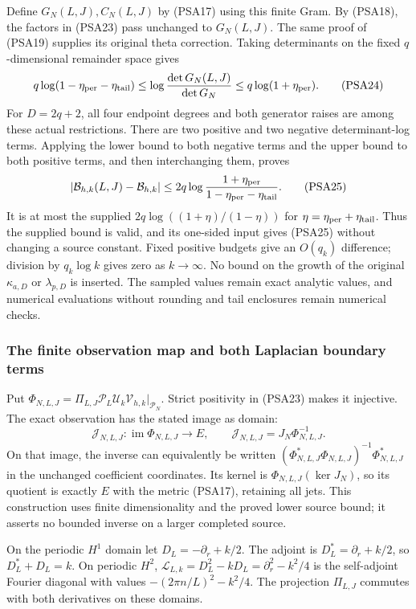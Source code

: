 Define $G_N(L,J),C_N(L,J)$ by (PSA17) using this finite Gram.
By (PSA18), the factors in (PSA23) pass unchanged to $G_N(L,J)$.
The same proof of (PSA19) supplies its original theta correction.
Taking determinants on the fixed $q$-dimensional remainder space gives
\[
 q\log(1-\eta_{\rm per}-\eta_{\rm tail})
 \le\log\frac{\det G_N(L,J)}{\det G_N}
 \le q\log(1+\eta_{\rm per}).
 \tag{PSA24}
\]
For $D=2q+2$, all four endpoint degrees and both generator raises
are among these actual restrictions. There are two positive and two
negative determinant-log terms. Applying the lower bound to both
negative terms and the upper bound to both positive terms, and then
interchanging them, proves
\[
 \left|\mathcal B_{h,k}(L,J)-\mathcal B_{h,k}\right|
 \le2q\log\frac{1+\eta_{\rm per}}
                         {1-\eta_{\rm per}-\eta_{\rm tail}}.
 \tag{PSA25}
\]
It is at most the supplied
$2q\log((1+\eta)/(1-\eta))$ for
$\eta=\eta_{\rm per}+\eta_{\rm tail}$. Thus the supplied bound is
valid, and its one-sided input gives (PSA25) without changing a source
constant. Fixed positive budgets give an $O(q_k)$ difference; division
by $q_k\log k$ gives zero as $k\to\infty$. No bound on the growth of
the original $\kappa_{a,D}$ or $\lambda_{p,D}$ is inserted. The
sampled values remain exact analytic values, and numerical evaluations
without rounding and tail enclosures remain numerical checks.

\subsubsection{The finite observation map and both Laplacian boundary terms}

Put $\Phi_{N,L,J}=\Pi_{L,J}\mathcal P_L\mathcal U_k
\mathcal V_{h,k}|_{\mathcal P_N}$. Strict positivity in (PSA23)
makes it injective. The exact observation has the stated image as
domain:
\[
 \mathcal J_{N,L,J}:\operatorname{im}\Phi_{N,L,J}\longrightarrow E,
 \qquad
 \mathcal J_{N,L,J}=J_N\Phi_{N,L,J}^{-1}.
 \tag{PSA26}
\]
On that image, the inverse can equivalently be written
$(\Phi_{N,L,J}^*\Phi_{N,L,J})^{-1}\Phi_{N,L,J}^*$ in the unchanged
coefficient coordinates. Its kernel is
$\Phi_{N,L,J}(\ker J_N)$, so its quotient is exactly $E$ with the
metric (PSA17), retaining all jets. This construction uses finite
dimensionality and the proved lower source bound; it asserts no
bounded inverse on a larger completed source.

On the periodic $H^1$ domain let $D_L=-\partial_r+k/2$.
The adjoint is $D_L^*=\partial_r+k/2$, so $D_L^*+D_L=k$.
On periodic $H^2$, $\mathscr L_{L,k}=D_L^2-kD_L
=\partial_r^2-k^2/4$ is the self-adjoint Fourier diagonal with
values $-(2\pi n/L)^2-k^2/4$. The projection $\Pi_{L,J}$ commutes
with both derivatives on these domains.

